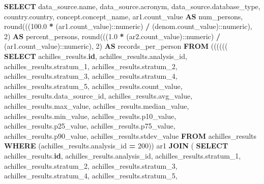 \documentclass[
]{book}
\newenvironment{Shaded}{\begin{snugshade}}{\end{snugshade}}
\newcommand{\CharTok}[1]{\textcolor[rgb]{0.31,0.60,0.02}{#1}}
\newcommand{\DecValTok}[1]{\textcolor[rgb]{0.00,0.00,0.81}{#1}}
\newcommand{\FloatTok}[1]{\textcolor[rgb]{0.00,0.00,0.81}{#1}}
\newcommand{\FunctionTok}[1]{\textcolor[rgb]{0.00,0.00,0.00}{#1}}
\newcommand{\KeywordTok}[1]{\textcolor[rgb]{0.13,0.29,0.53}{\textbf{#1}}}
\newcommand{\NormalTok}[1]{#1}
\newcommand{\OperatorTok}[1]{\textcolor[rgb]{0.81,0.36,0.00}{\textbf{#1}}}
\begin{document}
\begin{Shaded}
\begin{Highlighting}[]
\KeywordTok{SELECT}\NormalTok{ data\_source.name,}
\NormalTok{   data\_source.acronym,}
\NormalTok{   data\_source.database\_type,}
\NormalTok{   country.country,}
\NormalTok{   concept.concept\_name,}
\NormalTok{   ar1.count\_value }\KeywordTok{AS}\NormalTok{ num\_persons,}
   \FunctionTok{round}\NormalTok{(((}\FloatTok{100.0} \OperatorTok{*}\NormalTok{ (ar1.count\_value):}\CharTok{:numeric}\NormalTok{) }\OperatorTok{/}\NormalTok{ (denom.count\_value):}\CharTok{:numeric}\NormalTok{), }\DecValTok{2}\NormalTok{) }\KeywordTok{AS}\NormalTok{ percent\_persons,}
   \FunctionTok{round}\NormalTok{(((}\FloatTok{1.0} \OperatorTok{*}\NormalTok{ (ar2.count\_value):}\CharTok{:numeric}\NormalTok{) }\OperatorTok{/}\NormalTok{ (ar1.count\_value):}\CharTok{:numeric}\NormalTok{), }\DecValTok{2}\NormalTok{) }\KeywordTok{AS}\NormalTok{ records\_per\_person}
  \KeywordTok{FROM}\NormalTok{ (((((( }\KeywordTok{SELECT}\NormalTok{ achilles\_results.}\KeywordTok{id}\NormalTok{,}
\NormalTok{           achilles\_results.analysis\_id,}
\NormalTok{           achilles\_results.stratum\_1,}
\NormalTok{           achilles\_results.stratum\_2,}
\NormalTok{           achilles\_results.stratum\_3,}
\NormalTok{           achilles\_results.stratum\_4,}
\NormalTok{           achilles\_results.stratum\_5,}
\NormalTok{           achilles\_results.count\_value,}
\NormalTok{           achilles\_results.data\_source\_id,}
\NormalTok{           achilles\_results.avg\_value,}
\NormalTok{           achilles\_results.max\_value,}
\NormalTok{           achilles\_results.median\_value,}
\NormalTok{           achilles\_results.min\_value,}
\NormalTok{           achilles\_results.p10\_value,}
\NormalTok{           achilles\_results.p25\_value,}
\NormalTok{           achilles\_results.p75\_value,}
\NormalTok{           achilles\_results.p90\_value,}
\NormalTok{           achilles\_results.stdev\_value}
          \KeywordTok{FROM}\NormalTok{ achilles\_results}
         \KeywordTok{WHERE}\NormalTok{ (achilles\_results.analysis\_id }\OperatorTok{=} \DecValTok{200}\NormalTok{)) ar1}
    \KeywordTok{JOIN}\NormalTok{ ( }\KeywordTok{SELECT}\NormalTok{ achilles\_results.}\KeywordTok{id}\NormalTok{,}
\NormalTok{           achilles\_results.analysis\_id,}
\NormalTok{           achilles\_results.stratum\_1,}
\NormalTok{           achilles\_results.stratum\_2,}
\NormalTok{           achilles\_results.stratum\_3,}
\NormalTok{           achilles\_results.stratum\_4,}
\NormalTok{           achilles\_results.stratum\_5,}

\end{Highlighting}
\end{Shaded}
\end{document}
